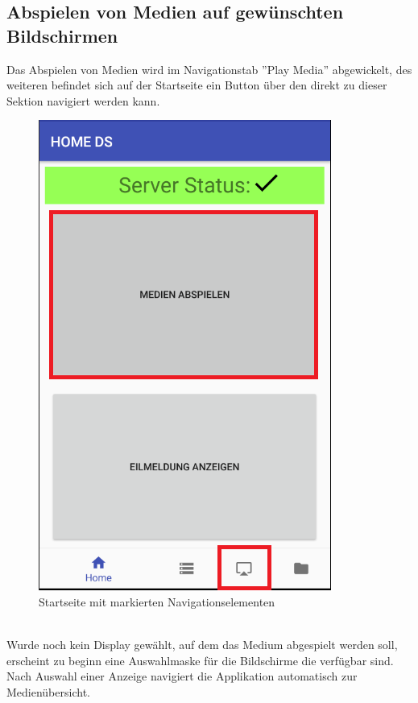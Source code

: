 \subsection{Abspielen von Medien auf gewünschten Bildschirmen}
Das Abspielen von Medien wird im Navigationstab ''Play Media'' abgewickelt, des weiteren befindet sich auf der Startseite ein Button über den direkt zu dieser Sektion navigiert werden kann.
\\
\begin{figure}[H]
\centering
\includegraphics[scale=0.35]{images/06_AndroidApp/06_mediaNavigation}
\caption{Startseite mit markierten Navigationselementen}
\label{fig:mediaNav}
\end{figure}
\\
Wurde noch kein Display gewählt, auf dem das Medium abgespielt werden soll, erscheint zu beginn eine Auswahlmaske für die Bildschirme die verfügbar sind. Nach Auswahl einer Anzeige navigiert die Applikation automatisch zur Medienübersicht. 
\\
